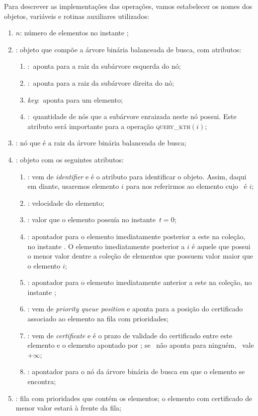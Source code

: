 Para descrever as implementações das operações, vamos
estabelecer os nomes dos objetos, variáveis e rotinas
auxiliares utilizados:
\begin{enumerate}
    \item $n$: número de elementos no instante \now;
    \item \no: objeto que compõe a árvore binária balanceada
            de busca, com atributos:
    \begin{enumerate}
        \item \esq$:$ aponta para a raiz da subárvore
        esquerda do nó;
        \item \dir$:$ aponta para a raiz da subárvore
        direita do nó;
        \item \textit{key}$:$ aponta para um elemento;
        \item \children$:$ quantidade de nós que a subárvore
        enraizada neste nó possui. Este atributo será importante
        para a operação \textsc{query\_kth}$(i)$;
    \end{enumerate}
    \item \raiz: nó que é a raiz da árvore binária balanceada de
                busca;
    \item \elemento: objeto com os seguintes atributos:
    \begin{enumerate}
        \item \id: vem de \textit{identifier} e é o atributo
        para identificar o objeto. Assim, daqui
        em diante, usaremos elemento $i$ para nos
        referirmos ao elemento cujo \id~é $i$;
        \item \speed: velocidade do elemento;
        \item \initv: valor que o elemento possuía no
        instante~$t = 0$;
        \item \nex: apontador para o elemento imediatamente
        posterior a este na coleção, no instante \now. O
        elemento imediatamente posterior a $i$ é aquele
        que possui o menor valor dentre a coleção de
        elementos que possuem valor maior que o elemento
        $i$;
        \item \prev: apontador para o elemento imediatamente
        anterior a este na coleção, no instante \now;
        \item \pqpos: vem de \textit{priority queue position} e
        aponta para a posição do certificado associado
        ao elemento na fila com prioridades;
        \item \cert: vem de \textit{certificate} e é o prazo de
        validade do certificado entre este elemento e o elemento
        apontado por \prev; se \prev~não aponta para ninguém,
        \cert~vale $+\infty$;
        \item \no: apontador para o nó da árvore binária de busca em
        que o elemento se encontra;
    \end{enumerate}
    \item \Q: fila com prioridades que contém os elementos; o
    elemento com certificado de menor valor estará à frente da fila;


\end{enumerate}
